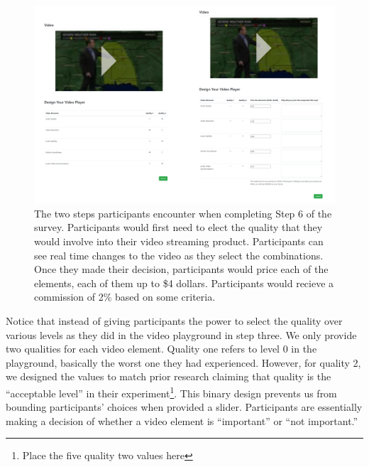 \begin{figure}[htpb]
    \centering
    \includegraphics[width=\textwidth, keepaspectratio=true]{content/image/design_task.png}
    \caption{
        The two steps participants encounter when completing Step 6 of the survey. Participants would first need to elect the quality that they would involve into their video streaming product. Participants can see real time changes to the video as they select the combinations. Once they made their decision, participants would price each of the elements, each of them up to \$4 dollars. Participants would recieve a commission of 2\% based on some criteria.
    }
    \label{fig:exp2_store}
\end{figure}

Notice that instead of giving participants the power to select the quality over various levels as they did in the video playground in step three. We only provide two qualities for each video element. Quality one refers to level 0 in the playground, basically the worst one they had experienced. However, for quality 2, we designed the values to match prior research claiming that quality is the ``acceptable level'' in their experiment\footnote{Place the five quality two values here}. This binary design prevents us from bounding participants' choices when provided a slider. Participants are essentially making a decision of whether a video element is ``important'' or ``not important.''

